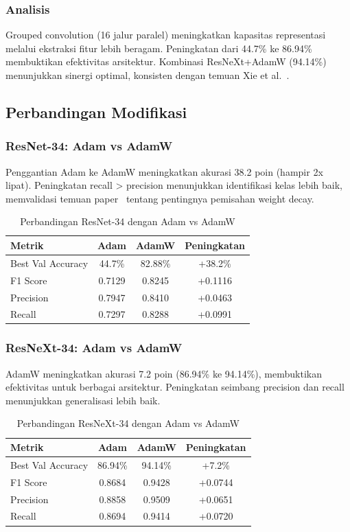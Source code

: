 \documentclass[11pt,a4paper]{article}
\begin{document}
\subsubsection{Analisis}
Grouped convolution (16 jalur paralel) meningkatkan kapasitas representasi melalui ekstraksi fitur lebih beragam. Peningkatan dari 44.7\% ke 86.94\% membuktikan efektivitas arsitektur. Kombinasi ResNeXt+AdamW (94.14\%) menunjukkan sinergi optimal, konsisten dengan temuan Xie et al.~\cite{xie2017aggregated}.

\subsection{Perbandingan Modifikasi}
\subsubsection{ResNet-34: Adam vs AdamW}
Penggantian Adam ke AdamW meningkatkan akurasi 38.2 poin (hampir 2x lipat). Peningkatan recall > precision menunjukkan identifikasi kelas lebih baik, memvalidasi temuan paper~\cite{loshchilov2017decoupled} tentang pentingnya pemisahan weight decay.
\begin{table}[h]
\centering
\caption{Perbandingan ResNet-34 dengan Adam vs AdamW}
\begin{tabular}{|l|c|c|c|}
\hline
\textbf{Metrik} & \textbf{Adam} & \textbf{AdamW} & \textbf{Peningkatan} \\ \hline
Best Val Accuracy & 44.7\% & 82.88\% & +38.2\% \\ \hline
F1 Score & 0.7129 & 0.8245 & +0.1116 \\ \hline
Precision & 0.7947 & 0.8410 & +0.0463 \\ \hline
Recall & 0.7297 & 0.8288 & +0.0991 \\ \hline
\end{tabular}
\end{table}

\subsubsection{ResNeXt-34: Adam vs AdamW}
AdamW meningkatkan akurasi 7.2 poin (86.94\% ke 94.14\%), membuktikan efektivitas untuk berbagai arsitektur. Peningkatan seimbang precision dan recall menunjukkan generalisasi lebih baik.
\begin{table}[h]
\centering
\caption{Perbandingan ResNeXt-34 dengan Adam vs AdamW}
\begin{tabular}{|l|c|c|c|}
\hline
\textbf{Metrik} & \textbf{Adam} & \textbf{AdamW} & \textbf{Peningkatan} \\ \hline
Best Val Accuracy & 86.94\% & 94.14\% & +7.2\% \\ \hline
F1 Score & 0.8684 & 0.9428 & +0.0744 \\ \hline
Precision & 0.8858 & 0.9509 & +0.0651 \\ \hline
Recall & 0.8694 & 0.9414 & +0.0720 \\ \hline
\end{tabular}
\end{table}
\end{document}
